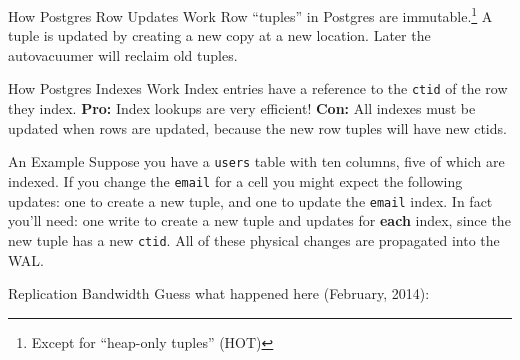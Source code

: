 \documentclass[14pt]{beamer}
\begin{document}
\begin{frame}{How Postgres Row Updates Work}
  Row ``tuples'' in Postgres are immutable.\footnote[1]{Except for ``heap-only
    tuples'' (HOT)}
  \newline
  \newline
  A tuple is updated by creating a new copy at a new location. Later the
  autovacuumer will reclaim old tuples.

\end{frame}

\begin{frame}{How Postgres Indexes Work}
  Index entries have a reference to the \texttt{ctid} of the row they index.
  \newline
  \newline
  \textbf{Pro:} Index lookups are very efficient!
  \newline
  \newline
  \textbf{Con:} All indexes must be updated when rows are updated, because the
  new row tuples will have new ctids.
\end{frame}

\begin{frame}{An Example}
  Suppose you have a \texttt{users} table with ten columns, five of which are
  indexed.
  \newline
  \newline
  If you change the \texttt{email} for a cell you might expect the following
  updates: one to create a new tuple, and one to update the \texttt{email}
  index.
  \newline
  \newline
  In fact you'll need: one write to create a new tuple and updates for
  \textbf{each} index, since the new tuple has a new \texttt{ctid}. All of these
  physical changes are propagated into the WAL.
\end{frame}

\begin{frame}{Replication Bandwidth}
  Guess what happened here (February, 2014):
  \newline
  \newline
\end{frame}
\end{document}
